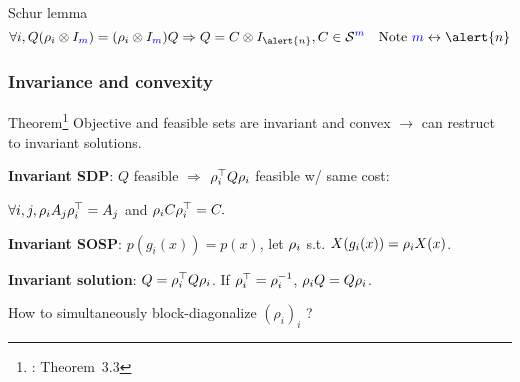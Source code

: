 \begin{frame}{Schur lemma}
  $$\forall i, Q (\induced_i \otimes I_{\textcolor{blue}{m}}) = (\induced_i \otimes I_{\textcolor{blue}{m}}) Q \Rightarrow Q = C \otimes I_{\alert{n}}, C \in \SymK[{\textcolor{blue}{m}}] \quad \text{Note }{\textcolor{blue}{m}} \leftrightarrow \alert{n}$$

\end{frame}

\begin{frame}[fragile]
  \frametitle{Invariance and convexity}
  \begin{block}{Theorem\footnote{\tiny \gatpar{}: Theorem~3.3}}
    Objective and feasible sets are \alert{invariant} and \alert{convex}
    $\to$
    can restruct to invariant solutions.
  \end{block}

    \textbf{Invariant SDP}:
    $Q$ feasible $\Rightarrow$ $\rho_i^\top Q \rho_i$ feasible w/ same cost:

    $\forall i, j, \rho_i A_j \rho_i^\top = A_j$ and $\rho_i C \rho_i^\top = C.$

    \textbf{Invariant SOSP}:
    $p(g_i(x)) = p(x)$, let $\rho_i$ s.t. $X(g_i(x)) = \rho_i X(x)$.

    \textbf{Invariant solution}:
    $Q = \rho_i^\top Q \rho_i$. If $\rho_i^\top = \rho_i^{-1}$, $\rho_i Q = Q \rho_i$.

  \begin{center}
    How to \alert{simultaneously} block-diagonalize $(\rho_i)_i$ ?
  \end{center}
\end{frame}
